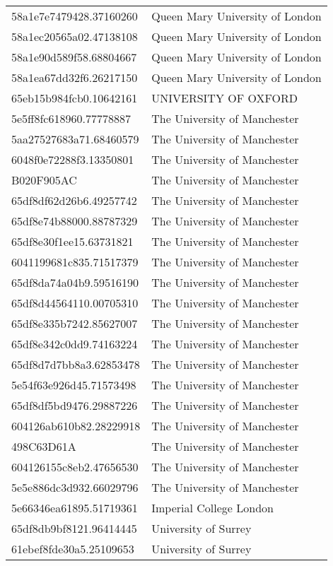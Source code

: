 \begin{tabular}{ll}
58a1e7e7479428.37160260 & Queen Mary University of London \\
58a1ec20565a02.47138108 & Queen Mary University of London \\
58a1e90d589f58.68804667 & Queen Mary University of London \\
58a1ea67dd32f6.26217150 & Queen Mary University of London \\
65eb15b984fcb0.10642161 & UNIVERSITY OF OXFORD \\
5e5ff8fc618960.77778887 & The University of Manchester \\
5aa27527683a71.68460579 & The University of Manchester \\
6048f0e72288f3.13350801 & The University of Manchester \\
B020F905AC & The University of Manchester \\
65df8df62d26b6.49257742 & The University of Manchester \\
65df8e74b88000.88787329 & The University of Manchester \\
65df8e30f1ee15.63731821 & The University of Manchester \\
6041199681c835.71517379 & The University of Manchester \\
65df8da74a04b9.59516190 & The University of Manchester \\
65df8d44564110.00705310 & The University of Manchester \\
65df8e335b7242.85627007 & The University of Manchester \\
65df8e342c0dd9.74163224 & The University of Manchester \\
65df8d7d7bb8a3.62853478 & The University of Manchester \\
5e54f63e926d45.71573498 & The University of Manchester \\
65df8df5bd9476.29887226 & The University of Manchester \\
604126ab610b82.28229918 & The University of Manchester \\
498C63D61A & The University of Manchester \\
604126155c8eb2.47656530 & The University of Manchester \\
5e5e886dc3d932.66029796 & The University of Manchester \\
5e66346ea61895.51719361 & Imperial College London \\
65df8db9bf8121.96414445 & University of Surrey \\
61ebef8fde30a5.25109653 & University of Surrey \\

\end{tabular}

